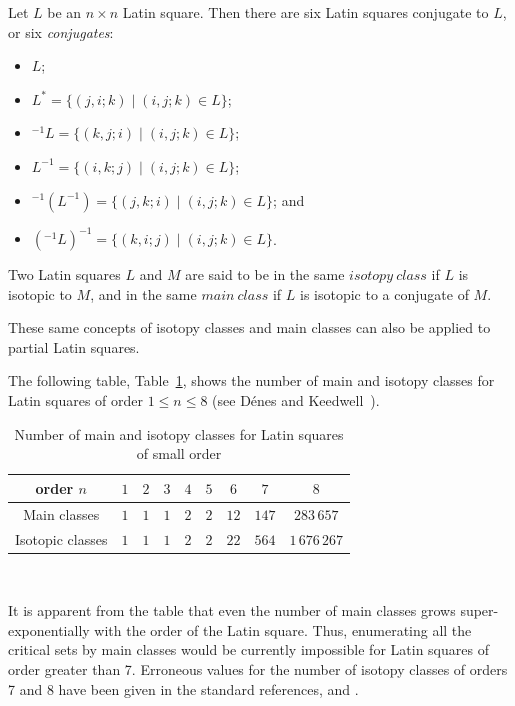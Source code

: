 \documentclass[12pt]{report}
\begin{document}
Let $L$ be an $n \times n$ Latin square.
Then there are six Latin squares conjugate to $L$, or six {\it conjugates}:

\begin{itemize}
\item[] $L$;
\item[] $L^{*} = \{ (j, i; k) \mid (i, j; k) \in L \}$;
\item[] $^{-1}L = \{ (k, j; i) \mid (i, j; k) \in L \}$;
\item[] $L^{-1} = \{ (i, k; j) \mid (i, j; k) \in L \}$;
\item[] $^{-1}(L^{-1}) = \{ (j, k; i) \mid (i, j; k) \in L \}$; and
\item[] $(^{-1}L)^{-1} = \{ (k, i; j) \mid (i, j; k) \in L \}$. \cite{dk}
\end{itemize}

Two Latin squares $L$ and $M$ are said to be in the same $isotopy~class$ if $L$ is isotopic to $M$, and 
in the same $main~class$ if $L$ is isotopic to a conjugate of $M$.

These same concepts of isotopy classes and main classes can also
be applied to partial Latin squares.

The following table, Table~\ref{mainiso}, shows the number of main and isotopy
classes for Latin squares of order $1\leq n\leq 8$ (see D{\'e}nes and
Keedwell~\cite{dk}). 

\begin{table}
\begin{center}
\caption{Number of main and isotopy classes for Latin squares of small order}
\label{mainiso}
\begin{tabular}{|c|c|c|c|c|c|c|c|c|} \hline
order $n$ & $1$ & $2$ & $3$ & $4$ & $5$ & $6$ & $7$ & $8$ \\ \hline
Main classes & $1$ & $1$ & $1$ & $2$ & $2$ & $12$ & $147$ & $283\,657$ \\ \hline
Isotopic classes & $1$ & $1$ & $1$ & $2$ & $2$ & $22$ & $564$ & $1\,676\,267$ \\ \hline
\end{tabular} \vspace {3mm} \\
\end{center}
\end{table}

It is apparent from the table that even the number of main classes
grows super-exponentially with the order of the Latin square.  Thus, enumerating
all the critical sets by main classes would be currently impossible for Latin
squares of order greater than 7.  Erroneous values for the number 
of isotopy classes of orders 7 and 8 have been given in the standard references, \cite{dk} 
and \cite{crc}.
\end{document}
